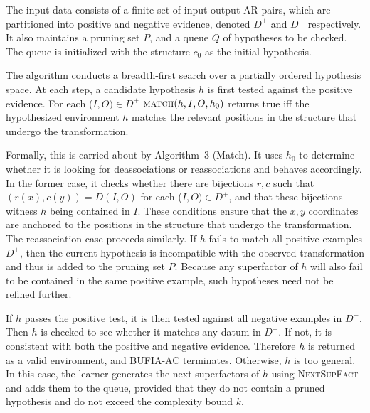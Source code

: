 \documentclass[pmlr]{jmlr}%
\begin{document}
	The input data consists of a finite set of input-output AR pairs,
	which are partitioned into positive and negative evidence, denoted
	$D^+$ and $D^-$ respectively. It also maintains a pruning set \(P\), and a queue \(Q\) of hypotheses to be checked. The queue is initialized with the structure \(c_0\) as the initial hypothesis.
	
	The algorithm conducts a breadth-first search over a partially ordered
	hypothesis space. At each step, a candidate hypothesis $h$ is first tested 
	against the positive evidence. For each (\(I,O)\in D^+\) $\textsc{match}(h, I, O,h_0)$ returns true iff the hypothesized environment \(h\) matches the relevant positions in the structure that undergo the transformation.
	
	Formally, this is carried about by Algorithm~3 (Match).
	It uses \(h_0\) to determine whether it is looking for deassociations or reassociations and behaves accordingly.
	In the former case, it checks whether there are bijections \(r,c\) such that \((r(x),c(y))=D(I,O)\) for each (\(I,O)\in D^+\), and that these bijections witness \(h\) being contained in \(I\).
	These conditions ensure that the \(x,y\) coordinates are anchored to the positions in the structure that undergo the transformation.
	The reassociation case proceeds similarly.
	If \(h\) fails to match all positive examples \(D^+\), then the current hypothesis is incompatible with the observed transformation and thus is added to the pruning set $P$.
	Because any superfactor of \(h\) will also fail to be contained in the same positive example, such hypotheses need not be refined further.
	
	If \(h\) passes the positive test, it is then tested against all
	negative examples in $D^-$. Then \(h\) is checked to see whether
	it matches any datum in $D^-$. If not, it is consistent with both the
	positive and negative evidence. Therefore \(h\) is returned as a valid
	environment, and BUFIA-AC terminates. Otherwise, \(h\) is too general.
	In this case, the learner generates the next superfactors of \(h\)
	using \textsc{NextSupFact} and adds them to the queue, provided that
	they do not contain a pruned hypothesis and do not exceed the
	complexity bound \(k\).
	
\end{document}
